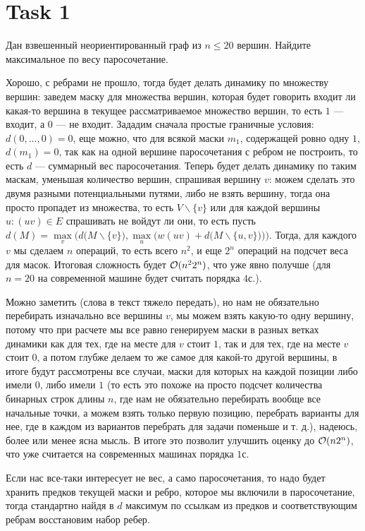 \section{Task 1}
\begin{task}
    Дан взвешенный неориентированный граф из $n \leq 20$ вершин. Найдите максимальное по весу паросочетание.
\end{task}

\begin{solution}
    Хорошо, с ребрами не прошло, тогда будет делать динамику по множеству вершин: заведем маску для множества вершин, которая будет говорить входит ли какая-то вершина в текущее рассматриваемое множество вершин, то есть $1$ --- входит, а $0$ --- не входит. Зададим сначала простые граничные условия: $d(0,\ldots,0) = 0$, еще можно, что для всякой маски $m_1$, содержащей ровно одну $1$, $d(m_1) = 0$, так как на одной вершине паросочетания с ребром не построить, то есть $d$ --- суммарный вес паросочетания.
    Теперь будет делать динамику по таким маскам, уменьшая количество вершин, спрашивая вершину $v$: можем сделать это двумя разными потенциальными путями, либо не взять вершину, тогда она просто пропадет из множества, то есть $V\backslash\{v\}$ или для каждой вершины $u:(uv)\in E$ спрашивать не войдут ли они, то есть пусть $d(M) = \max\limits_{v}\Bigg(d\big(M\backslash\{v\}\big), \max\limits_{u}\Big(w(uv) + d\big(M\backslash\{u,v\}\big)\Big)\Bigg)$.
    Тогда, для каждого $v$ мы сделаем $n$ операций, то есть всего $n^2$, и еще $2^n$ операций на подсчет веса для масок. Итоговая сложность будет $\mathcal{O}(n^22^n)$, что уже явно получше (для $n=20$ на современной машине будет считать порядка $4$с.).
    \begin{remark}
        Можно заметить (слова в текст тяжело передать), но нам не обязательно перебирать изначально все вершины $v$, мы можем взять какую-то одну вершину, потому что при расчете мы все равно генерируем маски в разных ветках динамики как для тех, где на месте для $v$ стоит $1$, так и для тех, где на месте $v$ стоит $0$, а потом глубже делаем то же самое для какой-то другой вершины, в итоге будут рассмотрены все случаи, маски для которых на каждой позиции либо имели $0$, либо имели $1$ (то есть это похоже на просто подсчет количества бинарных строк длины $n$, где нам не обязательно перебирать вообще все начальные точки, а можем взять только первую позицию, перебрать варианты для нее, где в каждом из вариантов перебрать для задачи поменьше и т. д.), надеюсь, более или менее ясна мысль. В итоге это позволит улучшить оценку до $\mathcal{O}(n2^n)$, что уже считается на современных машинах порядка $1$с.
    \end{remark}
    \begin{remark}
        Если нас все-таки интересует не вес, а само паросочетания, то надо будет хранить предков текущей маски и ребро, которое мы включили в паросочетание, тогда стандартно найдя в $d$ максимум по ссылкам из предков и соответствующим ребрам восстановим набор ребер.
    \end{remark}
\end{solution}